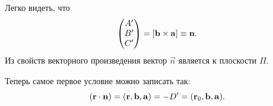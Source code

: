 Легко видеть, что
\begin{equation}
\begin{pmatrix}
	A'\\
	B'\\
	C'
\end{pmatrix} =
\left[\mathbf{b} \times \mathbf{a}\right] \equiv \mathbf{n}.
\end{equation}
Из свойств векторного произведения вектор $\vec n$ является  к плоскости $\Pi$.

Теперь  самое первое условие можно записать так:
\begin{equation}
\left(\mathbf{r} \cdot \mathbf{n}\right) = \left( \mathbf{r}, \mathbf{b}, \mathbf{a} \right) = -D' = (\mathbf{r}_0, \mathbf{b}, \mathbf{a}).
\end{equation}
